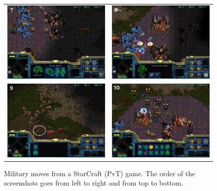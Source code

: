 \begin{figure}[!ht]
\begin{center}
\begin{tabular}{cc}
\includegraphics[width=7.8cm]{images/SC_game/SC_drop2a.png} &
\includegraphics[width=7.8cm]{images/SC_game/SC_drop2b.png} \\
\includegraphics[width=7.8cm]{images/SC_game/SC_dt_army.png} & 
\includegraphics[width=7.8cm]{images/SC_game/SC_final_attack.png}
\end{tabular}
\label{fig:SC_game2}
\caption{Military moves from a StarCraft (PvT) game. The order of the screenshots goes from left to right and from top to bottom.}
\end{center}
\end{figure}

